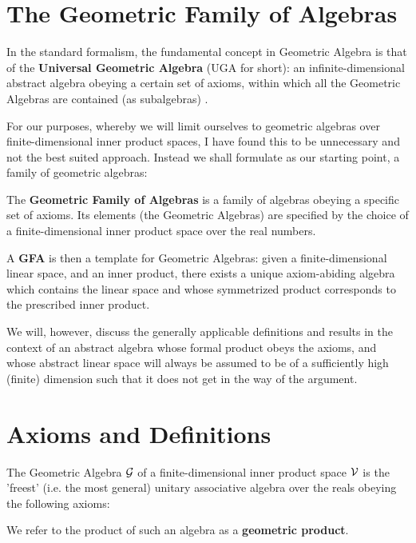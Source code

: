 \section{The Geometric Family of Algebras}\label{s:uga}

In the standard formalism, the fundamental concept in Geometric Algebra is that of the \textbf{Universal Geometric Algebra} (UGA for short): an infinite-dimensional abstract algebra obeying a certain set of axioms, within which all the Geometric Algebras are contained (as subalgebras) \cite{ga-origin}. 

For our purposes, whereby we will limit ourselves to geometric algebras over finite-dimensional inner product spaces, I have found this to be unnecessary and not the best suited approach. Instead we shall formulate as our starting point, a family of geometric algebras:
\begin{definition}
	The \textbf{Geometric Family of Algebras} is a family of algebras obeying a specific set of axioms. Its elements (the Geometric Algebras) are specified by the choice of a finite-dimensional inner product space over the real numbers.
\end{definition}

A \textbf{GFA} is then a template for Geometric Algebras: given a finite-dimensional linear space, and an inner product, there exists a unique axiom-abiding algebra which contains the linear space and whose symmetrized product corresponds to the prescribed inner product.

We will, however, discuss the generally applicable definitions and results in the context of an abstract algebra whose formal product obeys the axioms, and whose abstract linear space will always be assumed to be of a sufficiently high (finite) dimension such that it does not get in the way of the argument.


\section{Axioms and Definitions}\label{s:axioms-definitions}

The Geometric Algebra $\mathcal{G}$ of a finite-dimensional inner product space $\mathcal{V}$ is the 'freest' (i.e. the most general) unitary associative algebra over the reals obeying the following axioms:

We refer to the product of such an algebra as a \textbf{geometric product}.


